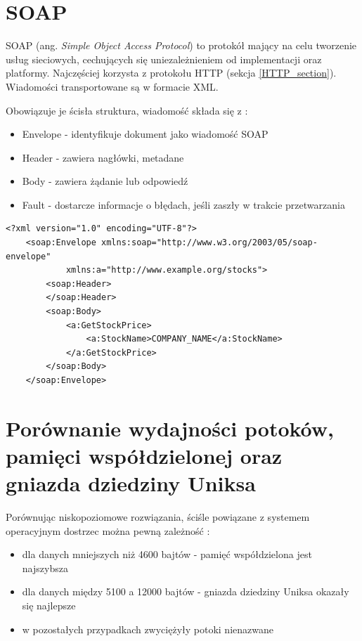 \section{SOAP}

SOAP (ang. \textit{Simple Object Access Protocol}) to protokół mający na celu tworzenie usług sieciowych, cechujących się uniezależnieniem od implementacji oraz platformy. Najczęściej korzysta z protokołu HTTP (sekcja \ref{HTTP_section}). Wiadomości transportowane są w formacie XML.

Obowiązuje je ścisła struktura, wiadomość składa się z \cite{SOAP}:
\begin{itemize}
    \item Envelope - identyfikuje dokument jako wiadomość SOAP
    \item Header - zawiera nagłówki, metadane
    \item Body - zawiera żądanie lub odpowiedź
    \item Fault - dostarcze informacje o błędach, jeśli zaszły w trakcie przetwarzania
\end{itemize}

\begin{lstlisting}[caption={Przykład zapytania, które jest zgodne z protokołem SOAP},captionpos=b]
    <?xml version="1.0" encoding="UTF-8"?>
    <soap:Envelope xmlns:soap="http://www.w3.org/2003/05/soap-envelope"
            xmlns:a="http://www.example.org/stocks">
        <soap:Header>
        </soap:Header>
        <soap:Body>
            <a:GetStockPrice>
                <a:StockName>COMPANY_NAME</a:StockName>
            </a:GetStockPrice>
        </soap:Body>
    </soap:Envelope>
\end{lstlisting}


\section{Porównanie wydajności potoków, pamięci współdzielonej oraz gniazda dziedziny Uniksa}

Porównując niskopoziomowe rozwiązania, ściśle powiązane z systemem operacyjnym dostrzec można pewną zależność \cite{ZX2011}:

\begin{itemize}
    \item dla danych mniejszych niż 4600 bajtów - pamięć współdzielona jest najszybsza
    \item dla danych między 5100 a 12000 bajtów - gniazda dziedziny Uniksa okazały się najlepsze
    \item w pozostałych przypadkach zwyciężyły potoki nienazwane
\end{itemize}
